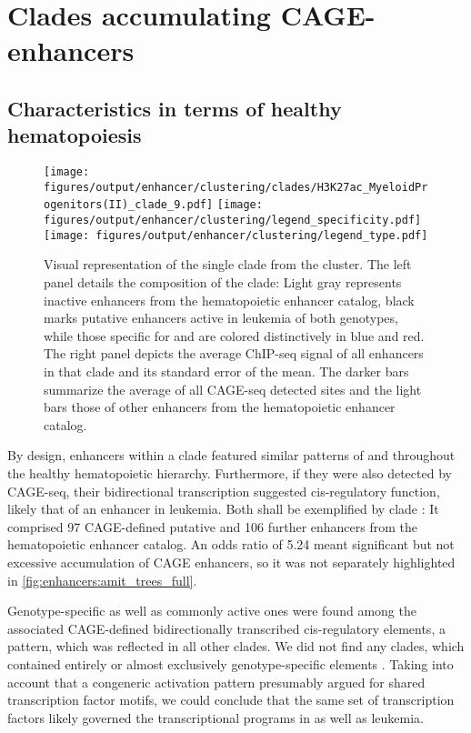 \section{Clades accumulating CAGE-enhancers}
\label{chap:r:enhancers:cluster:clades}
\subsection{Characteristics in terms of healthy hematopoiesis}
\label{chap:r:enhancers:cluster:clades:healthy}

\begin{figure}[!hb]
	\texttt{[image: figures/output/enhancer/clustering/clades/H3K27ac\_MyeloidProgenitors(II)\_clade\_9.pdf]}
		\texttt{[image: figures/output/enhancer/clustering/legend\_specificity.pdf]}
		\texttt{[image: figures/output/enhancer/clustering/legend\_type.pdf]}
	\caption{Visual representation of the single clade from the \amittwo cluster. The left panel details the composition of the clade: Light gray represents inactive enhancers from the hematopoietic enhancer catalog, black marks putative enhancers active in \mllafnine leukemia of both genotypes, while those specific for  \dnmtwtregular and \dnmtchipregular are colored distinctively in blue and red. The right panel depicts the average ChIP-seq signal of all enhancers in that clade and its standard error of the mean. The darker bars summarize the average of all CAGE-seq detected sites and the light bars those of other enhancers from the hematopoietic enhancer catalog.}
	\label{fig:enhancers:amit_regular_clade}
\end{figure}

By design, enhancers within a clade featured similar patterns of \hisfourone and \histwentysevenac throughout the healthy hematopoietic hierarchy. Furthermore, if they were also detected by CAGE-seq, their bidirectional transcription suggested cis-regulatory function, likely that of an enhancer in \mllafnine \kitpos leukemia. Both shall be exemplified by clade : It comprised \num{97} CAGE-defined putative and \num{106} further enhancers from the hematopoietic enhancer catalog. An odds ratio of \num{5.24} meant significant but not excessive accumulation of CAGE enhancers, so it was not separately highlighted in \autoref{fig:enhancers:amit_trees_full}. 

Genotype-specific as well as commonly active ones were found among the associated CAGE-defined bidirectionally transcribed cis-regulatory elements, a pattern, which was reflected in all other clades. We did not find any clades, which contained entirely or almost exclusively genotype-specific elements \dns. Taking into account that a congeneric activation pattern presumably argued for shared transcription factor motifs, we could conclude that the same set of transcription factors likely governed the transcriptional programs in \dnmtwt as well as \dnmtchip \mllafnine leukemia. 

